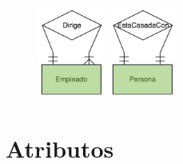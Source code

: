 \documentclass[12pt, fleqn]{report}                             %
\theoremstyle{break}                                            %
\begin{document}
                \begin{figure}[h]
                    \includegraphics[width=0.20\textwidth]{RelacionUnaria}
                    \includegraphics[width=0.20\textwidth]{RelacionUnaria2}
                \end{figure}


        \clearpage
        \section{Atributos}
\end{document}
